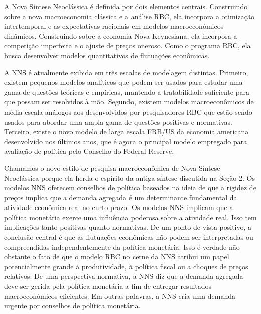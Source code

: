 \documentclass[12pt]{article}
\begin{document}
A Nova Síntese Neoclássica é definida por dois elementos centrais. Construindo sobre a nova macroeconomia clássica e a análise RBC, ela incorpora a otimização intertemporal e as expectativas racionais em modelos macroeconômicos dinâmicos. Construindo sobre a economia Nova-Keynesiana, ela incorpora a competição imperfeita e o ajuste de preços oneroso. Como o programa RBC, ela busca desenvolver modelos quantitativos de flutuações econômicas.

A NNS é atualmente exibida em três escalas de modelagem distintas. Primeiro, existem pequenos modelos analíticos que podem ser usados para estudar uma gama de questões teóricas e empíricas, mantendo a tratabilidade suficiente para que possam ser resolvidos à mão. Segundo, existem modelos macroeconômicos de média escala análogos aos desenvolvidos por pesquisadores RBC que estão sendo usados para abordar uma ampla gama de questões positivas e normativas. Terceiro, existe o novo modelo de larga escala FRB/US da economia americana desenvolvido nos últimos anos, que é agora o principal modelo empregado para avaliação de política pelo Conselho do Federal Reserve.

Chamamos o novo estilo de pesquisa macroeconômica de Nova Síntese Neoclássica porque ela herda o espírito da antiga síntese discutida na Seção 2. Os modelos NNS oferecem conselhos de política baseados na ideia de que a rigidez de preços implica que a demanda agregada é um determinante fundamental da atividade econômica real no curto prazo. Os modelos NNS implicam que a política monetária exerce uma influência poderosa sobre a atividade real. Isso tem implicações tanto positivas quanto normativas. De um ponto de vista positivo, a conclusão central é que as flutuações econômicas não podem ser interpretadas ou compreendidas independentemente da política monetária. Isso é verdade não obstante o fato de que o modelo RBC no cerne da NNS atribui um papel potencialmente grande à produtividade, à política fiscal ou a choques de preços relativos. De uma perspectiva normativa, a NNS diz que a demanda agregada deve ser gerida pela política monetária a fim de entregar resultados macroeconômicos eficientes. Em outras palavras, a NNS cria uma demanda urgente por conselhos de política monetária.
\end{document}
